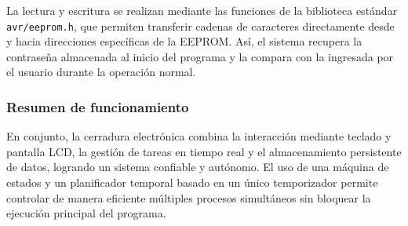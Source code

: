 La lectura y escritura se realizan mediante las funciones de la biblioteca estándar \texttt{avr/eeprom.h}, que permiten transferir cadenas de caracteres directamente desde y hacia direcciones específicas de la EEPROM. Así, el sistema recupera la contraseña almacenada al inicio del programa y la compara con la ingresada por el usuario durante la operación normal.

\vspace{1em}

\subsubsection{Resumen de funcionamiento}

En conjunto, la cerradura electrónica combina la interacción mediante teclado y pantalla LCD, la gestión de tareas en tiempo real y el almacenamiento persistente de datos, logrando un sistema confiable y autónomo. El uso de una máquina de estados y un planificador temporal basado en un único temporizador permite controlar de manera eficiente múltiples procesos simultáneos sin bloquear la ejecución principal del programa.









